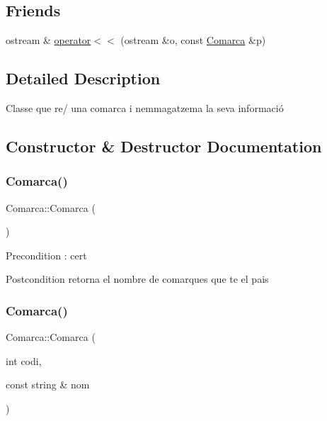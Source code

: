 \subsection*{Friends}
\begin{DoxyCompactItemize}
\item 
ostream \& \hyperlink{classComarca_a23f6b084aaeb22a3c2cfdbb11a6b6853}{operator$<$$<$} (ostream \&o, const \hyperlink{classComarca}{Comarca} \&p)
\end{DoxyCompactItemize}


\subsection{Detailed Description}
Classe que re/  una comarca i n\textquotesingle{}emmagatzema la seva informació 

\subsection{Constructor \& Destructor Documentation}
\mbox{\label{classComarca_a2c9c27819363b301ecb2fba47f198ee6}} 
\subsubsection{\texorpdfstring{Comarca()}{Comarca()}\hspace{0.1cm}{\footnotesize\ttfamily [1/2]}}
{\footnotesize\ttfamily Comarca\+::\+Comarca (\begin{DoxyParamCaption}{ }\end{DoxyParamCaption})}

\begin{DoxyPrecond}{Precondition}
\+: cert 
\end{DoxyPrecond}
\begin{DoxyPostcond}{Postcondition}
retorna el nombre de comarques que te el pais 
\end{DoxyPostcond}
\mbox{\label{classComarca_ae73301123c5aa51eeb1b763a7a616e7e}} 
\subsubsection{\texorpdfstring{Comarca()}{Comarca()}\hspace{0.1cm}{\footnotesize\ttfamily [2/2]}}
{\footnotesize\ttfamily Comarca\+::\+Comarca (\begin{DoxyParamCaption}\item[{int}]{codi,  }\item[{const string \&}]{nom }\end{DoxyParamCaption})}

